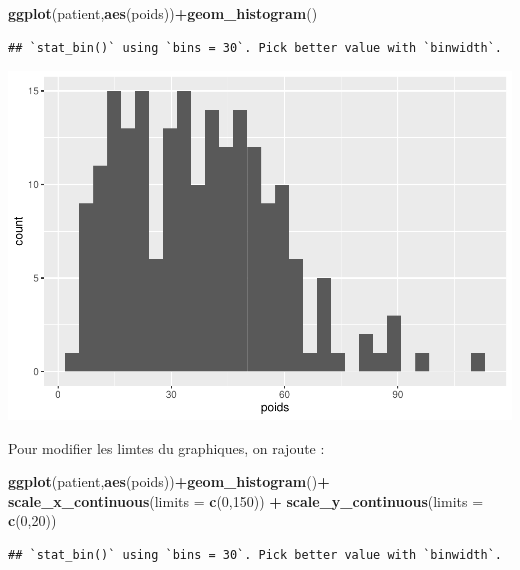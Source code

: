 \documentclass[
]{book}
\newenvironment{Shaded}{\begin{snugshade}}{\end{snugshade}}
\newcommand{\AttributeTok}[1]{\textcolor[rgb]{0.13,0.29,0.53}{#1}}
\newcommand{\DecValTok}[1]{\textcolor[rgb]{0.00,0.00,0.81}{#1}}
\newcommand{\FunctionTok}[1]{\textcolor[rgb]{0.13,0.29,0.53}{\textbf{#1}}}
\newcommand{\NormalTok}[1]{#1}
\newcommand{\SpecialCharTok}[1]{\textcolor[rgb]{0.81,0.36,0.00}{\textbf{#1}}}
\begin{document}
\begin{Shaded}
\begin{Highlighting}[]
\FunctionTok{ggplot}\NormalTok{(patient,}\FunctionTok{aes}\NormalTok{(poids))}\SpecialCharTok{+}\FunctionTok{geom\_histogram}\NormalTok{()}
\end{Highlighting}
\end{Shaded}

\begin{verbatim}
## `stat_bin()` using `bins = 30`. Pick better value with `binwidth`.
\end{verbatim}

\includegraphics{_main_files/figure-latex/ggplot3-1.pdf}

Pour modifier les limtes du graphiques, on rajoute :

\begin{Shaded}
\begin{Highlighting}[]
\FunctionTok{ggplot}\NormalTok{(patient,}\FunctionTok{aes}\NormalTok{(poids))}\SpecialCharTok{+}\FunctionTok{geom\_histogram}\NormalTok{()}\SpecialCharTok{+}
  \FunctionTok{scale\_x\_continuous}\NormalTok{(}\AttributeTok{limits =} \FunctionTok{c}\NormalTok{(}\DecValTok{0}\NormalTok{,}\DecValTok{150}\NormalTok{)) }\SpecialCharTok{+}
  \FunctionTok{scale\_y\_continuous}\NormalTok{(}\AttributeTok{limits =} \FunctionTok{c}\NormalTok{(}\DecValTok{0}\NormalTok{,}\DecValTok{20}\NormalTok{))}
\end{Highlighting}
\end{Shaded}

\begin{verbatim}
## `stat_bin()` using `bins = 30`. Pick better value with `binwidth`.
\end{verbatim}
\end{document}
